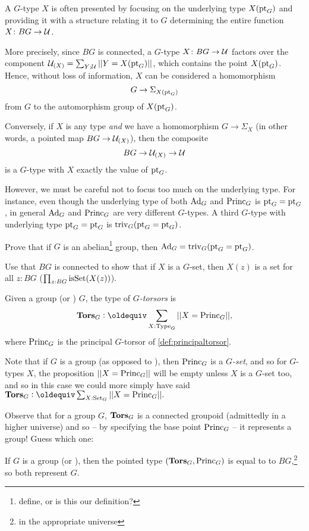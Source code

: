 \begin{remark}
  A $G$-type $X$ is often presented by focusing on the underlying type $X({\mathord{\mathrm{pt}}}_G)$  and providing it with a structure relating it to $G$ determining the entire function $X\colon BG\to\mathcal{U}$.

More precisely, since $BG$ is connected, a $G$-type $X\colon BG\to\mathcal{U}$ factors over the component $\mathcal{U}_{(X)}=\sum_{Y:\mathcal{U}}||Y=X({\mathord{\mathrm{pt}}}_G)||$, which contains the point $X({\mathord{\mathrm{pt}}}_G)$.  Hence, without loss of information, $X$ can be considered a homomorphism 
$$G\to\Sigma_{X({\mathord{\mathrm{pt}}}_G)}$$ from $G$ to the automorphism group of $X({\mathord{\mathrm{pt}}}_G)$.

Conversely, if $X$ is any type \emph{and} we have a homomorphism $G\to\Sigma_X$ (in other words, a pointed map $BG\to\mathcal{U}_{(X)}$), then the composite
$$BG\to \mathcal{U}_{(X)}\to \mathcal{U}$$
is a $G$-type with $X$ exactly the value of ${\mathord{\mathrm{pt}}}_G$.

However, we must be careful not to focus too much on the underlying type.  For instance, even though the underlying type of both $\mathrm{Ad}_G$ and $\mathrm{Princ}_G$ is ${\mathord{\mathrm{pt}}}_G={\mathord{\mathrm{pt}}}_G$, in general  $\mathrm{Ad}_G$ and $\mathrm{Princ}_G$  are very different $G$-types.  A third $G$-type with underlying type ${\mathord{\mathrm{pt}}}_G={\mathord{\mathrm{pt}}}_G$ is $\mathrm{triv}_G({\mathord{\mathrm{pt}}}_G={\mathord{\mathrm{pt}}}_G)$.
\end{remark}

\begin{xca}
  Prove that if $G$ is an abelian\footnote{define, or is this our definition?} group, then $\mathrm{Ad}_G=\mathrm{triv}_G({\mathord{\mathrm{pt}}}_G={\mathord{\mathrm{pt}}}_G)$.
\end{xca}
\begin{xca}
  Use that $BG$ is connected to show that if $X$ is a $G$-set, then $X(z)$ is a set for all $z:BG$ (\ie $\prod_{z:BG}\mathrm{isSet}(X(z))$).
\end{xca}
\begin{definition}
  Given a group (or \inftygp) $G$, the type of {\em$G$-torsors} is
$$\typetorsor_G\defequi\sum_{X:\Type_G}||X=\princ_G||,$$
where $\mathrm{Princ}_G$ is the principal $G$-torsor of \cref{def:principaltorsor}.
\end{definition}
\begin{remark}
  Note that if $G$ is a group (as opposed to \aninftygp), then $\mathrm{Princ}_G$ is a $G${\em-set}, and so for $G$-types $X$, the proposition $||X=\mathrm{Princ}_G||$ will be empty unless $X$ is a $G$-set too, and so in this case we could more simply have said $\typetorsor_G\defequi\sum_{X:\Set_G}||X=\princ_G||.$  

Observe that for a group $G$, $\mathbf{Tors}_G$ is a connected groupoid (admittedly in a higher universe) and so -- by specifying the base point $\mathrm{Princ}_G$ -- it represents a group!  Guess which one:
\end{remark}
\begin{lemma}\label{lem:BGbytorsor}
  If $G$ is a group (or \inftygp), then the pointed type $(\mathbf{Tors}_G,\mathrm{Princ}_G)$ is equal to to $BG$,\footnote{in the appropriate universe} so both represent $G$.
\end{lemma}

